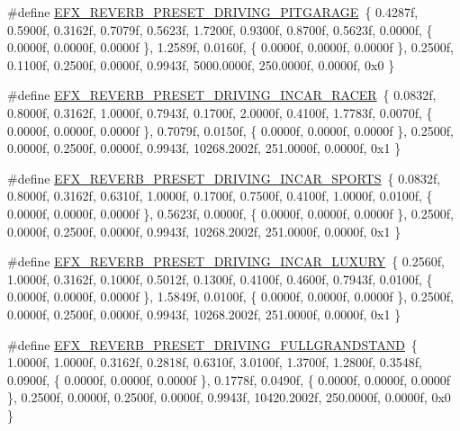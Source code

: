 \begin{DoxyCompactItemize}
\item 
\#define \hyperlink{efx-presets_8h_a444a33cea9eb540432f42b5d4b0486a8}{E\+F\+X\+\_\+\+R\+E\+V\+E\+R\+B\+\_\+\+P\+R\+E\+S\+E\+T\+\_\+\+D\+R\+I\+V\+I\+N\+G\+\_\+\+P\+I\+T\+G\+A\+R\+A\+GE}~\{ 0.\+4287f, 0.\+5900f, 0.\+3162f, 0.\+7079f, 0.\+5623f, 1.\+7200f, 0.\+9300f, 0.\+8700f, 0.\+5623f, 0.\+0000f, \{ 0.\+0000f, 0.\+0000f, 0.\+0000f \}, 1.\+2589f, 0.\+0160f, \{ 0.\+0000f, 0.\+0000f, 0.\+0000f \}, 0.\+2500f, 0.\+1100f, 0.\+2500f, 0.\+0000f, 0.\+9943f, 5000.\+0000f, 250.\+0000f, 0.\+0000f, 0x0 \}
\item 
\#define \hyperlink{efx-presets_8h_a2c7d0be0205e92c225e1c5cd96425ef1}{E\+F\+X\+\_\+\+R\+E\+V\+E\+R\+B\+\_\+\+P\+R\+E\+S\+E\+T\+\_\+\+D\+R\+I\+V\+I\+N\+G\+\_\+\+I\+N\+C\+A\+R\+\_\+\+R\+A\+C\+ER}~\{ 0.\+0832f, 0.\+8000f, 0.\+3162f, 1.\+0000f, 0.\+7943f, 0.\+1700f, 2.\+0000f, 0.\+4100f, 1.\+7783f, 0.\+0070f, \{ 0.\+0000f, 0.\+0000f, 0.\+0000f \}, 0.\+7079f, 0.\+0150f, \{ 0.\+0000f, 0.\+0000f, 0.\+0000f \}, 0.\+2500f, 0.\+0000f, 0.\+2500f, 0.\+0000f, 0.\+9943f, 10268.\+2002f, 251.\+0000f, 0.\+0000f, 0x1 \}
\item 
\#define \hyperlink{efx-presets_8h_aa42380cee817f0f23be5f9a103f9a723}{E\+F\+X\+\_\+\+R\+E\+V\+E\+R\+B\+\_\+\+P\+R\+E\+S\+E\+T\+\_\+\+D\+R\+I\+V\+I\+N\+G\+\_\+\+I\+N\+C\+A\+R\+\_\+\+S\+P\+O\+R\+TS}~\{ 0.\+0832f, 0.\+8000f, 0.\+3162f, 0.\+6310f, 1.\+0000f, 0.\+1700f, 0.\+7500f, 0.\+4100f, 1.\+0000f, 0.\+0100f, \{ 0.\+0000f, 0.\+0000f, 0.\+0000f \}, 0.\+5623f, 0.\+0000f, \{ 0.\+0000f, 0.\+0000f, 0.\+0000f \}, 0.\+2500f, 0.\+0000f, 0.\+2500f, 0.\+0000f, 0.\+9943f, 10268.\+2002f, 251.\+0000f, 0.\+0000f, 0x1 \}
\item 
\#define \hyperlink{efx-presets_8h_a0293b34a2488fe018f03138c9ebe391f}{E\+F\+X\+\_\+\+R\+E\+V\+E\+R\+B\+\_\+\+P\+R\+E\+S\+E\+T\+\_\+\+D\+R\+I\+V\+I\+N\+G\+\_\+\+I\+N\+C\+A\+R\+\_\+\+L\+U\+X\+U\+RY}~\{ 0.\+2560f, 1.\+0000f, 0.\+3162f, 0.\+1000f, 0.\+5012f, 0.\+1300f, 0.\+4100f, 0.\+4600f, 0.\+7943f, 0.\+0100f, \{ 0.\+0000f, 0.\+0000f, 0.\+0000f \}, 1.\+5849f, 0.\+0100f, \{ 0.\+0000f, 0.\+0000f, 0.\+0000f \}, 0.\+2500f, 0.\+0000f, 0.\+2500f, 0.\+0000f, 0.\+9943f, 10268.\+2002f, 251.\+0000f, 0.\+0000f, 0x1 \}
\item 
\#define \hyperlink{efx-presets_8h_a73de691b5ec4544039c8e61c175d35fc}{E\+F\+X\+\_\+\+R\+E\+V\+E\+R\+B\+\_\+\+P\+R\+E\+S\+E\+T\+\_\+\+D\+R\+I\+V\+I\+N\+G\+\_\+\+F\+U\+L\+L\+G\+R\+A\+N\+D\+S\+T\+A\+ND}~\{ 1.\+0000f, 1.\+0000f, 0.\+3162f, 0.\+2818f, 0.\+6310f, 3.\+0100f, 1.\+3700f, 1.\+2800f, 0.\+3548f, 0.\+0900f, \{ 0.\+0000f, 0.\+0000f, 0.\+0000f \}, 0.\+1778f, 0.\+0490f, \{ 0.\+0000f, 0.\+0000f, 0.\+0000f \}, 0.\+2500f, 0.\+0000f, 0.\+2500f, 0.\+0000f, 0.\+9943f, 10420.\+2002f, 250.\+0000f, 0.\+0000f, 0x0 \}

\end{DoxyCompactItemize}
